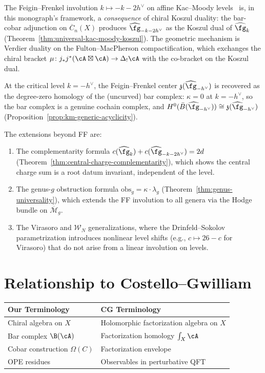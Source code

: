 \begin{remark}\label{rem:feigin-frenkel-comparison}
The Feigin--Frenkel involution $k \mapsto -k - 2h^\vee$ on affine
Kac--Moody levels~\cite{Feigin-Frenkel} is, in this monograph's framework,
a \emph{consequence} of chiral Koszul duality: the bar-cobar adjunction on
$\overline{C}_n(X)$ produces $\widehat{\fg}_{-k-2h^\vee}$ as the Koszul
dual of $\widehat{\fg}_k$ (Theorem~\ref{thm:universal-kac-moody-koszul}).
The geometric mechanism is Verdier duality on the Fulton--MacPherson
compactification, which exchanges the chiral bracket
$\mu\colon j_*j^*(\cA \boxtimes \cA) \to \Delta_!\cA$
with the co-bracket on the Koszul dual.

At the critical level $k = -h^\vee$, the Feigin--Frenkel center
$\mathfrak{z}(\widehat{\fg}_{-h^\vee})$ is recovered as the degree-zero
homology of the (uncurved) bar complex: $\kappa = 0$ at $k = -h^\vee$,
so the bar complex is a genuine cochain complex, and
$H^0(\bar{B}(\widehat{\fg}_{-h^\vee})) \cong \mathfrak{z}(\widehat{\fg}_{-h^\vee})$
(Proposition~\ref{prop:km-generic-acyclicity}).

The extensions beyond FF are:
\begin{enumerate}[label=(\roman*)]
\item The complementarity formula $c(\widehat{\fg}_k) + c(\widehat{\fg}_{-k-2h^\vee}) = 2d$
  (Theorem~\ref{thm:central-charge-complementarity}), which shows the
  central charge sum is a root datum invariant, independent of the level.
\item The genus-$g$ obstruction formula $\mathrm{obs}_g = \kappa \cdot \lambda_g$
  (Theorem~\ref{thm:genus-universality}), which extends the FF involution
  to all genera via the Hodge bundle on $\overline{\mathcal{M}}_g$.
\item The Virasoro and $\mathcal{W}_N$ generalizations, where the
  Drinfeld--Sokolov parametrization introduces nonlinear level shifts
  (e.g., $c \mapsto 26 - c$ for Virasoro) that do not arise from a linear
  involution on levels.
\end{enumerate}
\end{remark}


\section{Relationship to Costello--Gwilliam}

\begin{tabular}{>{\raggedright\arraybackslash}p{}>{\raggedright\arraybackslash}p{}}
\textbf{Our Terminology} & \textbf{CG Terminology} \\
\hline
Chiral algebra on $X$ & Holomorphic factorization algebra on $X$ \\
Bar complex $\B(\cA)$ & Factorization homology $\int_X \cA$ \\
Cobar construction $\Omega(C)$ & Factorization envelope \\
OPE residues & Observables in perturbative QFT \\
\end{tabular}

